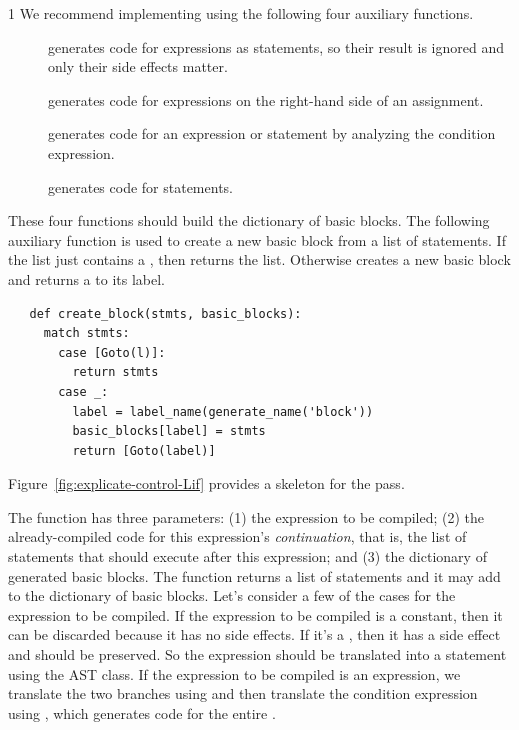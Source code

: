 \documentclass[7x10]{TimesAPriori_MIT}%
\def\pythonEd{1}
\providecommand{\BookEdition}{1}
\let\edition\BookEdition
\newcommand{\pythonColor}[0]{}
\numberwithin{theorem}{chapter}
\numberwithin{definition}{chapter}
\numberwithin{equation}{chapter}
\begin{document}
{\if\edition\pythonEd\pythonColor
%
We recommend implementing  using the
following four auxiliary functions.
\begin{description}
\item[] generates code for expressions as
  statements, so their result is ignored and only their side effects
  matter.
\item[] generates code for expressions
  on the right-hand side of an assignment.
\item[] generates code for an 
  expression or statement by analyzing the condition expression.
\item[] generates code for statements.
\end{description}
These four functions should build the dictionary of basic blocks. The
following auxiliary function  is used to create a
new basic block from a list of statements. If the list just contains a
, then  returns the list.  Otherwise
 creates a new basic block and returns a
 to its label.
\begin{center}
\begin{minipage}{\textwidth}
\begin{lstlisting}
   def create_block(stmts, basic_blocks):
     match stmts:
       case [Goto(l)]:
         return stmts
       case _:
         label = label_name(generate_name('block'))
         basic_blocks[label] = stmts
         return [Goto(label)]
\end{lstlisting}
\end{minipage}
\end{center}
Figure~\ref{fig:explicate-control-Lif} provides a skeleton for the
 pass.

The  function has three parameters: (1) the
expression to be compiled; (2) the already-compiled code for this
expression's \emph{continuation}, that is, the list of statements that
should execute after this expression; and (3) the dictionary of
generated basic blocks. The  function returns
a list of \LangCIf{} statements and it may add to the dictionary of
basic blocks.
%
Let's consider a few of the cases for the expression to be compiled.
If the expression to be compiled is a constant, then it can be
discarded because it has no side effects. If it's a \CREAD{}, then it
has a side effect and should be preserved. So the expression should be
translated into a statement using the  AST class. If the
expression to be compiled is an  expression, we translate the
two branches using  and then translate the
condition expression using , which generates
code for the entire .

}
\end{document}
